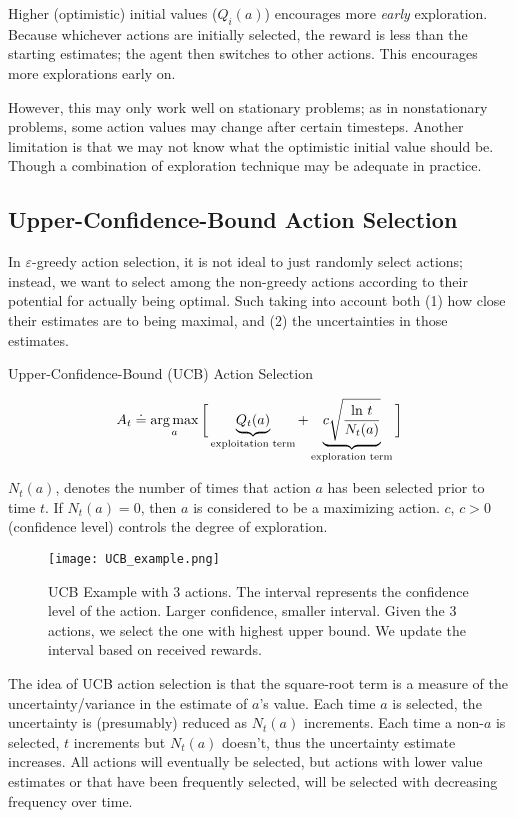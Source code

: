 \documentclass[sutton_barto_notes.tex]{subfiles}
\begin{document}
Higher (optimistic) initial values ($Q_i(a)$) encourages more \textit{early} exploration. Because whichever actions are initially selected, the
reward is less than the starting estimates; the agent then switches to other actions. This encourages more explorations early on.

However, this may only work well on stationary problems; as in nonstationary problems, some action values may change after certain timesteps. Another limitation is that we may not know what the optimistic initial value should be. Though a combination of exploration technique may be adequate in practice.

\subsection{Upper-Confidence-Bound Action Selection}

In $\varepsilon$-greedy action selection, it is not ideal to just randomly select actions; instead, we want to select among the non-greedy actions according to their potential for actually being optimal. Such taking into account both (1) how close their estimates are to being maximal, and (2) the uncertainties in those estimates.

\begin{definition}
Upper-Confidence-Bound (UCB) Action Selection

\[
A_t \doteq \operatorname*{arg\,max}_a \bigg[ \underbrace{Q_t(a)}_{\text{exploitation term}} + \underbrace{c\sqrt{\frac{\text{ln }t}{N_t(a)}}}_{\text{exploration term}} \bigg]
\]
\end{definition}
$N_t(a)$, denotes the number of times that action $a$ has been selected prior to time $t$. If $N_t(a)=0$, then $a$ is considered to be a maximizing action.
$c$, $c > 0$ (confidence level) controls the degree of exploration.

\begin{figure}[!h]
  \centering
  \texttt{[image: UCB\_example.png]}
  \caption{UCB Example with 3 actions. The interval represents the confidence level of the action. Larger confidence, smaller interval. Given the 3 actions, we select the one with highest upper bound. We update the interval based on received rewards.}
  \label{fig:UCB_example}
\end{figure}

The idea of UCB action selection is that the square-root term is a measure of the uncertainty/variance in the estimate of $a$'s value.
Each time $a$ is selected, the uncertainty is (presumably) reduced as $N_t(a)$ increments.
Each time a non-$a$ is selected, $t$ increments but $N_t(a)$ doesn't, thus the uncertainty estimate increases.
All actions will eventually be selected, but actions with lower value estimates or that have been frequently selected, will be selected with decreasing frequency over time.
\end{document}
